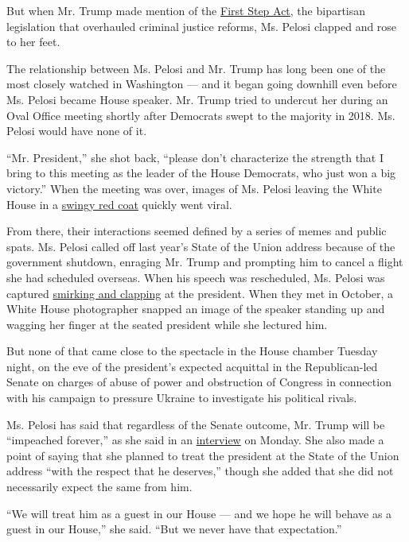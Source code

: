 But when Mr. Trump made mention of the
\href{https://www.nytimes.com/2018/12/18/us/politics/senate-criminal-justice-bill.html}{First
Step Act}, the bipartisan legislation that overhauled criminal justice
reforms, Ms. Pelosi clapped and rose to her feet.

The relationship between Ms. Pelosi and Mr. Trump has long been one of
the most closely watched in Washington --- and it began going downhill
even before Ms. Pelosi became House speaker. Mr. Trump tried to undercut
her during an Oval Office meeting shortly after Democrats swept to the
majority in 2018. Ms. Pelosi would have none of it.

``Mr. President,'' she shot back, ``please don't characterize the
strength that I bring to this meeting as the leader of the House
Democrats, who just won a big victory.'' When the meeting was over,
images of Ms. Pelosi leaving the White House in a
\href{https://www.nytimes.com/2018/12/12/fashion/nancy-pelosi-coat.html}{swingy
red coat} quickly went viral.

From there, their interactions seemed defined by a series of memes and
public spats. Ms. Pelosi called off last year's State of the Union
address because of the government shutdown, enraging Mr. Trump and
prompting him to cancel a flight she had scheduled overseas. When his
speech was rescheduled, Ms. Pelosi was captured
\href{https://www.nytimes.com/2019/02/06/us/politics/pelosi-clapback.html}{smirking
and clapping} at the president. When they met in October, a White House
photographer snapped an image of the speaker standing up and wagging her
finger at the seated president while she lectured him.

But none of that came close to the spectacle in the House chamber
Tuesday night, on the eve of the president's expected acquittal in the
Republican-led Senate on charges of abuse of power and obstruction of
Congress in connection with his campaign to pressure Ukraine to
investigate his political rivals.

Ms. Pelosi has said that regardless of the Senate outcome, Mr. Trump
will be ``impeached forever,'' as she said in an
\href{https://www.nytimes.com/2020/02/03/us/politics/pelosi-impeachment.html}{interview}
on Monday. She also made a point of saying that she planned to treat the
president at the State of the Union address ``with the respect that he
deserves,'' though she added that she did not necessarily expect the
same from him.

``We will treat him as a guest in our House --- and we hope he will
behave as a guest in our House,'' she said. ``But we never have that
expectation.''

